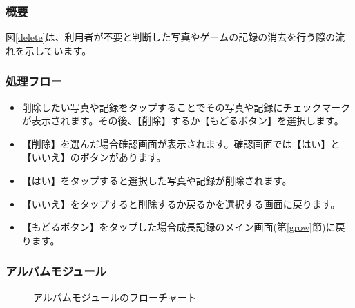 \documentclass[a4j]{jarticle}
\begin{document}
\subsubsection*{概要}
図\ref{delete}は、利用者が不要と判断した写真やゲームの記録の消去を行う際の流れを示しています。

\subsubsection*{処理フロー}
\begin{itemize}
\item 削除したい写真や記録をタップすることでその写真や記録にチェックマークが表示されます。その後、【削除】するか【もどるボタン】を選択します。
\item 【削除】を選んだ場合確認画面が表示されます。確認画面では【はい】と【いいえ】のボタンがあります。
\item 【はい】をタップすると選択した写真や記録が削除されます。
\item 【いいえ】をタップすると削除するか戻るかを選択する画面に戻ります。
\item 【もどるボタン】をタップした場合成長記録のメイン画面(第\ref{grow}節)に戻ります。
\end{itemize}

\subsubsection{アルバムモジュール\label{Albam}}
\begin{figure}[H]
    \begin{center}
    \caption {アルバムモジュールのフローチャート}
    \label{albam}
    \end{center}
\end{figure}
\end{document}
